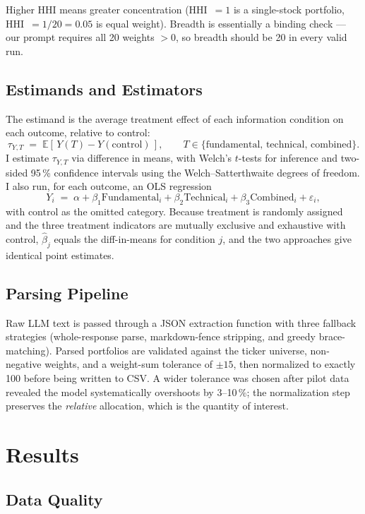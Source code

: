 \documentclass[11pt]{article}
\begin{document}
Higher HHI means greater concentration (HHI~$=1$ is a single-stock
portfolio, HHI~$=1/20 = 0.05$ is equal weight). Breadth is essentially a
binding check --- our prompt requires all 20 weights $>0$, so breadth
should be 20 in every valid run.

\subsection{Estimands and Estimators}

The estimand is the average treatment effect of each information condition
on each outcome, relative to control:
\[
\tau_{Y,T} \;=\; \mathbb{E}\!\left[\, Y(T) - Y(\text{control}) \,\right],
\qquad T \in \{\text{fundamental},\, \text{technical},\, \text{combined}\}.
\]
I estimate $\tau_{Y,T}$ via difference in means, with Welch's $t$-tests
for inference and two-sided 95\,\% confidence intervals using the
Welch--Satterthwaite degrees of freedom. I also run, for each outcome, an
OLS regression
\[
Y_i \;=\; \alpha + \beta_1 \text{Fundamental}_i + \beta_2 \text{Technical}_i +
\beta_3 \text{Combined}_i + \varepsilon_i,
\]
with control as the omitted category. Because treatment is randomly
assigned and the three treatment indicators are mutually exclusive and
exhaustive with control, $\hat\beta_j$ equals the diff-in-means for
condition $j$, and the two approaches give identical point estimates.

\subsection{Parsing Pipeline}

Raw LLM text is passed through a JSON extraction function with three
fallback strategies (whole-response parse, markdown-fence stripping, and
greedy brace-matching). Parsed portfolios are validated against the
ticker universe, non-negative weights, and a weight-sum tolerance of
$\pm 15$, then normalized to exactly 100 before being written to CSV.
A wider tolerance was chosen after pilot data revealed the model
systematically overshoots by 3--10\,\%; the normalization step preserves
the \emph{relative} allocation, which is the quantity of interest.

\section{Results}

\subsection{Data Quality}
\end{document}
